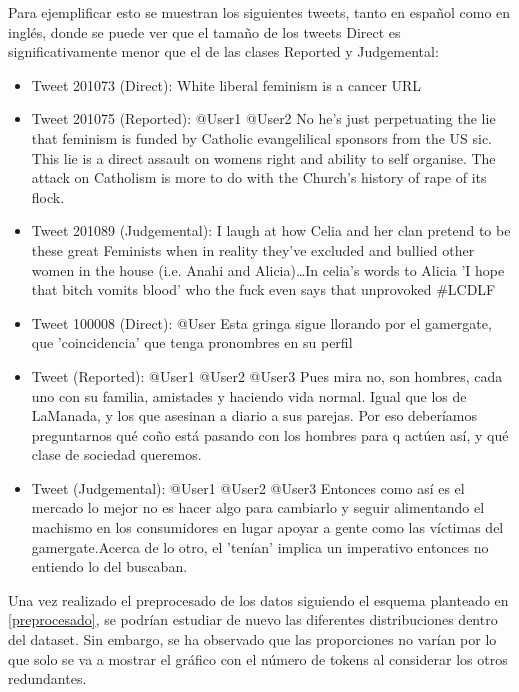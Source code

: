 Para ejemplificar esto se muestran los siguientes tweets, tanto en español como en inglés, donde se puede ver que el tamaño de los tweets Direct es significativamente menor que el de las clases Reported y Judgemental:

\begin{itemize}
    \item Tweet 201073 (Direct): White liberal feminism is a cancer {URL}
    \item Tweet 201075 (Reported): @User1 @User2 No he's just perpetuating the lie that feminism is funded by  Catholic evangelilical sponsors from the US sic. This lie is a direct assault on womens right and ability to self organise. The attack on Catholism is more to do with the Church's history of  rape of its flock.
    \item Tweet 201089 (Judgemental): I laugh at how Celia and her clan pretend to be these great Feminists when in reality they’ve excluded and bullied other women in the house (i.e. Anahi and Alicia)…In celia’s words to Alicia 'I hope that bitch vomits blood' who the fuck even says that unprovoked \#LCDLF
    \item Tweet 100008 (Direct): @User Esta gringa sigue llorando por el gamergate, que 'coincidencia' que tenga pronombres en su perfil
    \item Tweet (Reported): @User1 @User2 @User3 Pues mira no, son hombres, cada uno con su familia, amistades y haciendo vida normal. Igual que los de LaManada, y los que asesinan a diario a sus parejas. Por eso deberíamos preguntarnos qué coño está pasando con los hombres para q actúen así, y qué clase de sociedad queremos.
    \item Tweet (Judgemental): @User1 @User2 @User3 Entonces como así es el mercado lo mejor no es hacer algo para cambiarlo y seguir alimentando el machismo en los consumidores en lugar apoyar a gente como las víctimas del gamergate.Acerca de lo otro, el 'tenían' implica un imperativo entonces no entiendo lo del buscaban.
\end{itemize}



Una vez realizado el preprocesado de los datos siguiendo el esquema planteado en \autoref{preprocesado}, se podrían estudiar de nuevo las diferentes distribuciones dentro del dataset. Sin embargo, se ha observado que las proporciones no varían por lo que solo se va a mostrar el gráfico con el número de tokens al considerar los otros redundantes.

